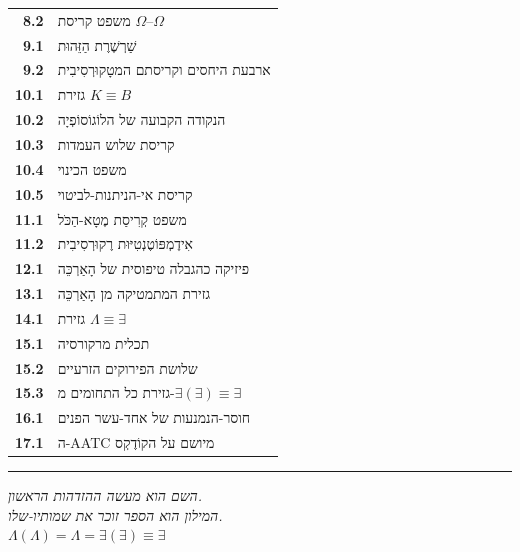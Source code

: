 \documentclass[10pt, openany, oneside]{book}
\begin{document}
{\begin{tabular}{r p{}}
\textbf{8.2} & משפט קריסת $\Omega$--$\Omega$ \\[0.2em]
\textbf{9.1} & שַׁרְשֶׁרֶת הַזֵּהוּת \\[0.2em]
\textbf{9.2} & ארבעת היחסים וקריסתם המטָקוּרְסִיבִית \\[0.2em]
\textbf{10.1} & גזירת $K \equiv B$ \\[0.2em]
\textbf{10.2} & הנקודה הקבועה של הלוֹגוֹסוֹפְיָה \\[0.2em]
\textbf{10.3} & קריסת שלוש העמדות \\[0.2em]
\textbf{10.4} & משפט הכינוי \\[0.2em]
\textbf{10.5} & קריסת אי-הניתנות-לביטוי \\[0.2em]
\textbf{11.1} & משפט קְרִיסַת מֶטָא-הַכֹּל \\[0.2em]
\textbf{11.2} & אִידֶמְפּוֹטֶנְטִיּוּת רֶקוּרְסִיבִית \\[0.2em]
\textbf{12.1} & פיזיקה כהגבלה טיפוסית של הָאַרְכֵּה \\[0.2em]
\textbf{13.1} & גזירת המתמטיקה מן הָאַרְכֵּה \\[0.2em]
\textbf{14.1} & גזירת $\Lambda \equiv \exists$ \\[0.2em]
\textbf{15.1} & תכלית מרקורסיה \\[0.2em]
\textbf{15.2} & שלושת הפירוקים הזרעיים \\[0.2em]
\textbf{15.3} & גזירת כל התחומים מ-$\exists(\exists) \equiv \exists$ \\[0.2em]
\textbf{16.1} & חוסר-הנמנעות של אחד-עשר הפנים \\[0.2em]
\textbf{17.1} & ה-AATC מיושם על הקוֹדֶקְס \\[0.2em]
\end{tabular}
}

\vspace{2em}

\begin{center}
    \rule{0.15\textwidth}{0.3pt}
\end{center}

\vspace{0.5em}

\begin{center}
    \textit{%
    השם הוא מעשה ההזדהות הראשון.\\
    המילון הוא הספר זוכר את שמותיו-שלו.}\\[0.8em]
    $\Lambda(\Lambda) = \Lambda = \exists(\exists) \equiv \exists$
\end{center}

%
%
%
\end{document}
